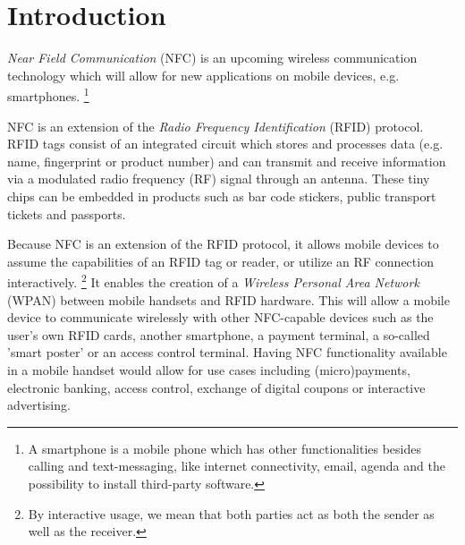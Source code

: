 \section{Introduction}


\textit{Near Field Communication} (NFC) is an upcoming wireless communication technology which will allow for new applications on mobile devices, e.g. smartphones. \footnote{A smartphone is a mobile phone which has other functionalities besides calling and text-messaging, like internet connectivity, email, agenda and the possibility to install third-party software.}

NFC is an extension of the \textit{Radio Frequency Identification} (RFID) protocol.
RFID tags consist of an integrated circuit which stores and processes data (e.g. name, fingerprint or product number) and can transmit and receive information via a modulated radio frequency (RF) signal through an antenna.
These tiny chips can be embedded in products such as bar code stickers, public transport tickets and passports.

 
Because NFC is an extension of the RFID protocol, it allows mobile devices to assume the capabilities of an RFID tag or reader, or utilize an RF connection interactively. \footnote{By interactive usage, we mean that both parties act as both the sender as well as the receiver.}
It enables the creation of a \textit{Wireless Personal Area Network} (WPAN) between mobile handsets and RFID hardware.
This will allow a mobile device to communicate wirelessly with other NFC-capable devices such as the user's own RFID cards, another smartphone, a payment terminal, a so-called 'smart poster' or an access control terminal.
Having NFC functionality available in a mobile handset would allow for use cases including (micro)payments, electronic banking, access control, exchange of digital coupons or interactive advertising.

